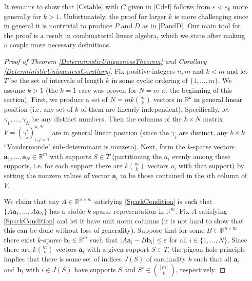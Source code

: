\documentclass[journal, onecolumn]{IEEEtran}
\begin{document}

It remains to show that \eqref{Cstable} with $C$ given in \eqref{Cdef} follows from $\varepsilon < \varepsilon_0$ more generally for $k > 1$. Unfortunately, the proof for larger $k$ is more challenging since in general it is nontrivial to produce $P$ and $D$ as in \eqref{PandD}. Our main tool for the proof is a result in combinatorial linear algebra, which we state after making a couple more necessary definitions.



\begin{proof}[Proof of Theorem \ref{DeterministicUniquenessTheorem} and Corollary \ref{DeterministicUniquenessCorollary}]
Fix positive integers $n, m$ and $k < m$ and let $T$ be the set of intervals of length $k$ in some cyclic ordering of $\{1, \ldots, m\}$. We assume $k > 1$ (the $k=1$ case was proven for $N=m$ at the beginning of this section). First, we produce a set of $N = mk{m \choose k}$ vectors in $\mathbb{R}^k$ in general linear position (i.e. any set of $k$ of them are linearly independent). Specifically, let $\gamma_1, \ldots, \gamma_N$ be any distinct numbers. Then the columns of the $k \times N$ matrix $V = (\gamma^i_j)^{k,N}_{i,j=1}$ are in general linear position (since the $\gamma_j$ are distinct, any $k \times k$ ``Vandermonde" sub-determinant is nonzero). Next, form the $k$-sparse vectors $\mathbf{a}_1, \ldots, \mathbf{a}_N \in \mathbb{R}^m$ with supports $S \in T$ (partitioning the $a_i$ evenly among these supports, i.e. for each support there are $k{m \choose k}$ vectors $a_i$ with that support) by setting the nonzero values of vector $\mathbf{a}_i$ to be those contained in the $i$th column of $V$.

We claim that any $A \in \mathbb{R}^{n \times m}$ satisfying \eqref{SparkCondition} is such that $\{A\mathbf{a}_1, \ldots, A\mathbf{a}_N\}$ has a stable $k$-sparse representation in $\mathbb{R}^m$. Fix $A$ satisfying \eqref{SparkCondition} and let it have unit norm columns (it is not hard to show that this can be done without loss of generality). Suppose that for some $B \in \mathbb{R}^{n \times m}$ there exist $k$-sparse $\mathbf{b}_i \in \mathbb{R}^m$ such that $|A\mathbf{a}_i - B\mathbf{b}_i| \leq \varepsilon$ for all $i \in \{1, \ldots, N\}$. Since there are $k{m \choose k}$ vectors $\mathbf{a}_i$ with a given support $S \in T$, the pigeon-hole principle implies that there is some set of indices $J(S)$ of cardinality $k$ such that all $\mathbf{a}_i$ and $\mathbf{b}_i$ with $i \in J(S)$ have supports $S$ and $S' \in {[m] \choose k}$, respectively.


\end{proof}
\end{document}

